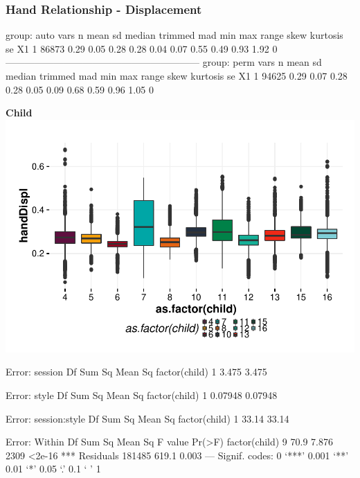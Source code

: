 \documentclass{article}
\begin{document}
\subsubsection{Hand Relationship - Displacement}
\begin{Schunk}
\begin{Soutput}
group: auto
   vars     n mean   sd median trimmed  mad  min  max range skew kurtosis se
X1    1 86873 0.29 0.05   0.28    0.28 0.04 0.07 0.55  0.49 0.93     1.92  0
------------------------------------------------------------ 
group: perm
   vars     n mean   sd median trimmed  mad  min  max range skew kurtosis se
X1    1 94625 0.29 0.07   0.28    0.28 0.05 0.09 0.68  0.59 0.96     1.05  0
\end{Soutput}
\end{Schunk}

\textbf{Child}
\includegraphics{features-plot_handdisplacement_child_quiz}

\begin{Schunk}
\begin{Soutput}
Error: session
              Df Sum Sq Mean Sq
factor(child)  1  3.475   3.475

Error: style
              Df  Sum Sq Mean Sq
factor(child)  1 0.07948 0.07948

Error: session:style
              Df Sum Sq Mean Sq
factor(child)  1  33.14   33.14

Error: Within
                  Df Sum Sq Mean Sq F value Pr(>F)    
factor(child)      9   70.9   7.876    2309 <2e-16 ***
Residuals     181485  619.1   0.003                   
---
Signif. codes:  0 ‘***’ 0.001 ‘**’ 0.01 ‘*’ 0.05 ‘.’ 0.1 ‘ ’ 1
\end{Soutput}
\end{Schunk}
\end{document}
